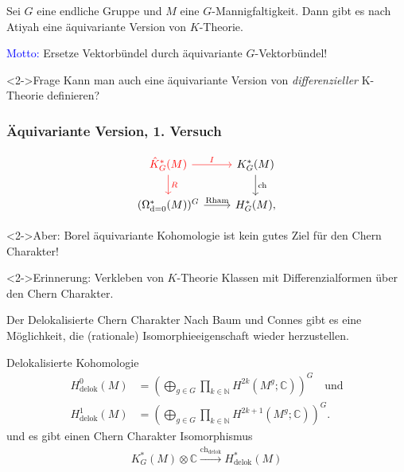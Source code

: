 \documentclass[12pt,utf8,notheorems,compress,t]{beamer}
\renewcommand{\_}{\mathpunct{.}}
\newcommand{\?}{\,{:}\,}
\newcommand{\dd}{\textup{d}}
\newcommand{\CC}{\mathbb{C}}
\newcommand{\N}{\mathbb{N}}
\begin{document}
\begin{frame}
    Sei $G$ eine endliche Gruppe und $M$ eine $G$-Mannigfaltigkeit. Dann gibt es
    nach Atiyah eine äquivariante Version von $K$-Theorie.
    
    \textcolor{blue}{Motto:} Ersetze Vektorbündel durch äquivariante
    $G$-Vektorbündel!
    \begin{block}<2->{Frage}
        Kann man auch eine äquivariante Version von
        \emph{differenzieller} K-Theorie definieren?
    \end{block}
\end{frame}

\begin{frame}\frametitle{Äquivariante Version, 1. Versuch}
\begin{equation}\begin{tikzcd}[ampersand replacement=\&]
        \textcolor{red}{\hat K_G^*(M)} \arrow[d,
        "R", red]\arrow[r, "I", red] \& K_G^*(M)\arrow[d, "\mathrm{ch}"] \\ 
        (\Omega^*_{\dd=0}(M))^G \arrow[r, "\mathrm{Rham}"]\& H_G^*(M),
\end{tikzcd}\nonumber
\end{equation}
\begin{alertblock}<2->{Aber:}
    Borel äquivariante Kohomologie ist kein gutes Ziel für den Chern Charakter!
\end{alertblock}
\begin{block}<2->{Erinnerung:}
    Verkleben von $K$-Theorie Klassen mit Differenzialformen über den Chern
    Charakter. 
\end{block}
\end{frame}
\begin{frame}{Der Delokalisierte Chern Charakter}
    Nach Baum und Connes gibt es eine Möglichkeit, die (rationale)
    Isomorphieeigenschaft wieder herzustellen.
    \begin{block}{Delokalisierte Kohomologie}
        \vspace{-1em}
        \begin{align*}
            H^0_\mathrm{delok}(M) &= \left( \bigoplus_{g\in G} \prod_{k\in\N}
            H^{2k}(M^g;\CC)\right)^G\quad\mathrm{und}\\
            H^1_\mathrm{delok}(M) &= \left( \bigoplus_{g\in G} \prod_{k\in\N}
            H^{2k+1}(M^g;\CC)\right)^G.
        \end{align*}
        und es gibt einen Chern Charakter Isomorphismus
        \begin{align*}
            K_G^*(M)\otimes \CC
            \stackrel{\mathrm{ch}_{\mathrm{delok}}}{\longrightarrow}
            H_\mathrm{delok}^*(M)
        \end{align*}
    \end{block}
\end{frame}
\end{document}
